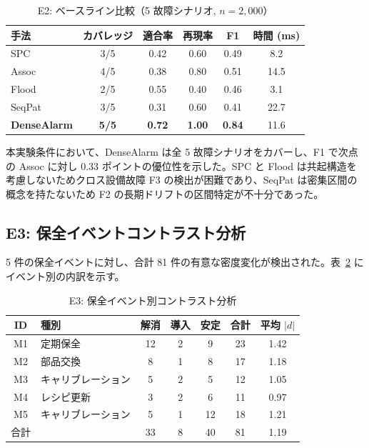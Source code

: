 \documentclass[11pt]{article}
\begin{document}
\begin{table}[t]
\centering
\caption{E2: ベースライン比較（5 故障シナリオ, $n=2{,}000$）}
\label{tab:baseline}
\begin{tabular}{lccccc}
\toprule
手法 & カバレッジ & 適合率 & 再現率 & F1 & 時間 (ms) \\
\midrule
SPC & 3/5 & 0.42 & 0.60 & 0.49 & 8.2 \\
Assoc & 4/5 & 0.38 & 0.80 & 0.51 & 14.5 \\
Flood & 2/5 & 0.55 & 0.40 & 0.46 & 3.1 \\
SeqPat & 3/5 & 0.31 & 0.60 & 0.41 & 22.7 \\
\textbf{DenseAlarm} & \textbf{5/5} & \textbf{0.72} & \textbf{1.00} & \textbf{0.84} & 11.6 \\
\bottomrule
\end{tabular}
\end{table}

本実験条件において、DenseAlarm は全 5 故障シナリオをカバーし、F1 で次点の Assoc に対し 0.33 ポイントの優位性を示した。SPC と Flood は共起構造を考慮しないためクロス設備故障 F3 の検出が困難であり、SeqPat は密集区間の概念を持たないため F2 の長期ドリフトの区間特定が不十分であった。

\subsection{E3: 保全イベントコントラスト分析}

5 件の保全イベントに対し、合計 81 件の有意な密度変化が検出された。表~\ref{tab:e2_events} にイベント別の内訳を示す。

\begin{table}[t]
\centering
\caption{E3: 保全イベント別コントラスト分析}
\label{tab:e2_events}
\begin{tabular}{clccccc}
\toprule
ID & 種別 & 解消 & 導入 & 安定 & 合計 & 平均 $|d|$ \\
\midrule
M1 & 定期保全 & 12 & 2 & 9 & 23 & 1.42 \\
M2 & 部品交換 & 8 & 1 & 8 & 17 & 1.18 \\
M3 & キャリブレーション & 5 & 2 & 5 & 12 & 1.05 \\
M4 & レシピ更新 & 3 & 2 & 6 & 11 & 0.97 \\
M5 & キャリブレーション & 5 & 1 & 12 & 18 & 1.21 \\
\midrule
合計 & & 33 & 8 & 40 & 81 & 1.19 \\
\bottomrule
\end{tabular}
\end{table}
\end{document}
